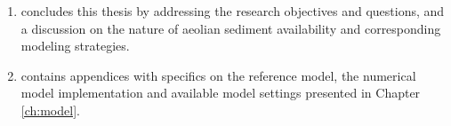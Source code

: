 \begin{enumerate}[{Part} I]

\item concludes this thesis by addressing the research objectives and
  questions, and a discussion on the nature of aeolian sediment
  availability and corresponding modeling strategies.

\item contains appendices with specifics on the reference model, the
  numerical model implementation and available model settings
  presented in Chapter \ref{ch:model}.

\end{enumerate}

